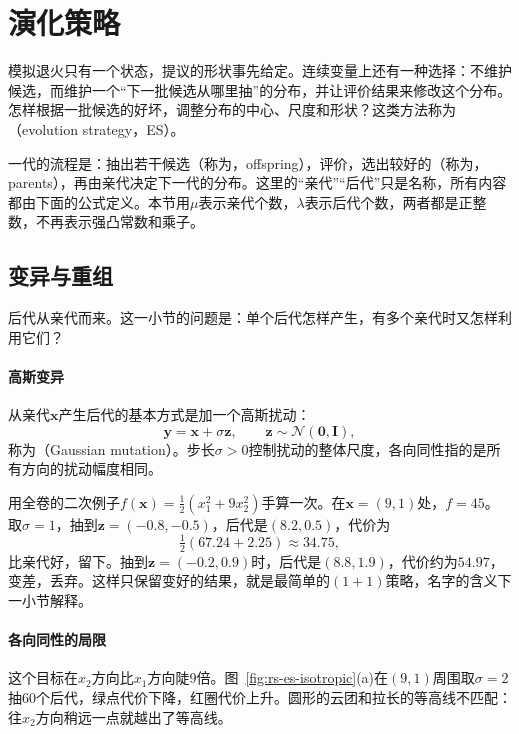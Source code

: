 \section{演化策略}
\label{sec:rs-es}

模拟退火只有一个状态，提议的形状事先给定。连续变量上还有一种选择：不维护候选，而维护一个“下一批候选从哪里抽”的分布，并让评价结果来修改这个分布。怎样根据一批候选的好坏，调整分布的中心、尺度和形状？这类方法称为（evolution strategy，ES）。

一代的流程是：抽出若干候选（称为，offspring），评价，选出较好的（称为，parents），再由亲代决定下一代的分布。这里的“亲代”“后代”只是名称，所有内容都由下面的公式定义。本节用$\mu$表示亲代个数，$\lambda$表示后代个数，两者都是正整数，不再表示强凸常数和乘子。

\subsection{变异与重组}
\label{sec:rs-es-mutation}

后代从亲代而来。这一小节的问题是：单个后代怎样产生，有多个亲代时又怎样利用它们？

\paragraph{高斯变异}
从亲代$\bm{x}$产生后代的基本方式是加一个高斯扰动：
\begin{equation}
 \bm{y}=\bm{x}+\sigma\bm{z},\qquad\bm{z}\sim\mathcal{N}(\bm{0},\bm{I}),
 \label{eq:rs-mutation}
\end{equation}
称为（Gaussian mutation）。步长$\sigma>0$控制扰动的整体尺度，各向同性指的是所有方向的扰动幅度相同。

用全卷的二次例子$f(\bm{x})=\tfrac12(x_1^2+9x_2^2)$手算一次。在$\bm{x}=(9,1)$处，$f=45$。取$\sigma=1$，抽到$\bm{z}=(-0.8,-0.5)$，后代是$(8.2,0.5)$，代价为
\[
 \tfrac12(67.24+2.25)\approx34.75,
\]
比亲代好，留下。抽到$\bm{z}=(-0.2,0.9)$时，后代是$(8.8,1.9)$，代价约为$54.97$，变差，丢弃。这样只保留变好的结果，就是最简单的$(1+1)$策略，名字的含义下一小节解释。

\paragraph{各向同性的局限}
这个目标在$x_2$方向比$x_1$方向陡$9$倍。图~\ref{fig:rs-es-isotropic}(a)在$(9,1)$周围取$\sigma=2$抽$60$个后代，绿点代价下降，红圈代价上升。圆形的云团和拉长的等高线不匹配：往$x_2$方向稍远一点就越出了等高线。

